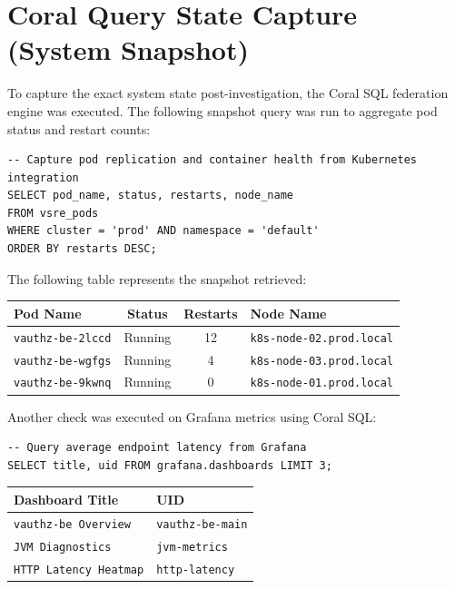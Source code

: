 \documentclass[10pt,a4paper]{article}
\begin{document}
\section{Coral Query State Capture (System Snapshot)}
To capture the exact system state post-investigation, the Coral SQL federation engine was executed. The following snapshot query was run to aggregate pod status and restart counts:

\begin{lstlisting}
-- Capture pod replication and container health from Kubernetes integration
SELECT pod_name, status, restarts, node_name 
FROM vsre_pods 
WHERE cluster = 'prod' AND namespace = 'default' 
ORDER BY restarts DESC;
\end{lstlisting}

\noindent The following table represents the snapshot retrieved:

\vspace{8pt}
\noindent\begin{tabularx}{\textwidth}{@{} l c c X @{}}
    \toprule
    \textbf{Pod Name} & \textbf{Status} & \textbf{Restarts} & \textbf{Node Name} \\
    \midrule
    \texttt{vauthz-be-2lccd} & Running & 12 & \texttt{k8s-node-02.prod.local} \\
    \texttt{vauthz-be-wgfgs} & Running & 4  & \texttt{k8s-node-03.prod.local} \\
    \texttt{vauthz-be-9kwnq} & Running & 0  & \texttt{k8s-node-01.prod.local} \\
    \bottomrule
\end{tabularx}
\vspace{10pt}

Another check was executed on Grafana metrics using Coral SQL:
\begin{lstlisting}
-- Query average endpoint latency from Grafana
SELECT title, uid FROM grafana.dashboards LIMIT 3;
\end{lstlisting}

\vspace{5pt}
\noindent\begin{tabularx}{\textwidth}{@{} l X @{}}
    \toprule
    \textbf{Dashboard Title} & \textbf{UID} \\
    \midrule
    \texttt{vauthz-be Overview} & \texttt{vauthz-be-main} \\
    \texttt{JVM Diagnostics} & \texttt{jvm-metrics} \\
    \texttt{HTTP Latency Heatmap} & \texttt{http-latency} \\
    \bottomrule
\end{tabularx}
\end{document}
